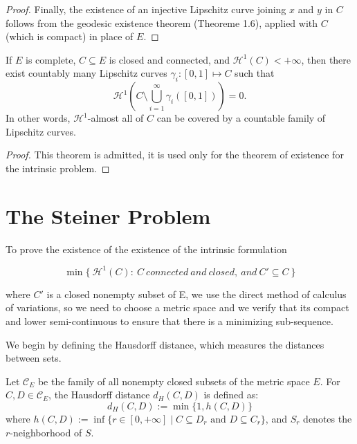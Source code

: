 \documentclass[12pt]{article}
\begin{document}
{\begin{proof}
    Finally, the existence of an injective Lipschitz curve joining $x$ and $y$ in 
    $C$ follows from the geodesic existence theorem (Theoreme 1.6), applied with $C$ (which is compact) in place 
    of $E$.
\end{proof}

\begin{theorem}
    If $E$ is complete, $C \subseteq E$ is closed and connected, and 
    $\mathcal{H}^1(C) < +\infty$, then there exist countably many Lipschitz 
    curves $\gamma_i : [0, 1] \mapsto C$ such that
    \[
        \mathcal{H}^1\!\left(C \setminus \bigcup_{i=1}^{\infty} \gamma_i([0,1])\right) = 0.
    \]
    In other words, $\mathcal{H}^1$-almost all of $C$ can be covered by a 
    countable family of Lipschitz curves.
\end{theorem}

\begin{proof}
    This theorem is admitted, it is used only for the theorem of existence for the intrinsic problem.
\end{proof}



\section{The Steiner Problem} \label{sec:steiner}

To prove the existence of the existence of the intrinsic formulation 

\begin{equation}
     \min \{ \ \mathcal{H}^1(C) : \ C \ connected \ and \ closed, \ and \ C' \subseteq C \ \}
\end{equation}

where $C'$ is a closed nonempty subset of E, we use the direct method of calculus of variations, so we need to choose a metric space and we verify that its compact and lower semi-continuous to ensure that there is a minimizing sub-sequence.

We begin by defining the Hausdorff distance, which measures the distances between sets.

\begin{definition}
    Let $\mathcal{C}_E$ be the family of all nonempty closed subsets of the metric space $E$. For $C, D \in \mathcal{C}_E$, the Hausdorff distance $d_H(C, D)$ is defined as:$$d_H(C, D) := \min\{1, h(C, D)\}$$where $h(C, D) := \inf\{r \in [0, +\infty] \mid C \subseteq D_r \text{ and } D \subseteq C_r\}$, and $S_r$ denotes the $r$-neighborhood of $S$.
\end{definition}

}
\end{document}
